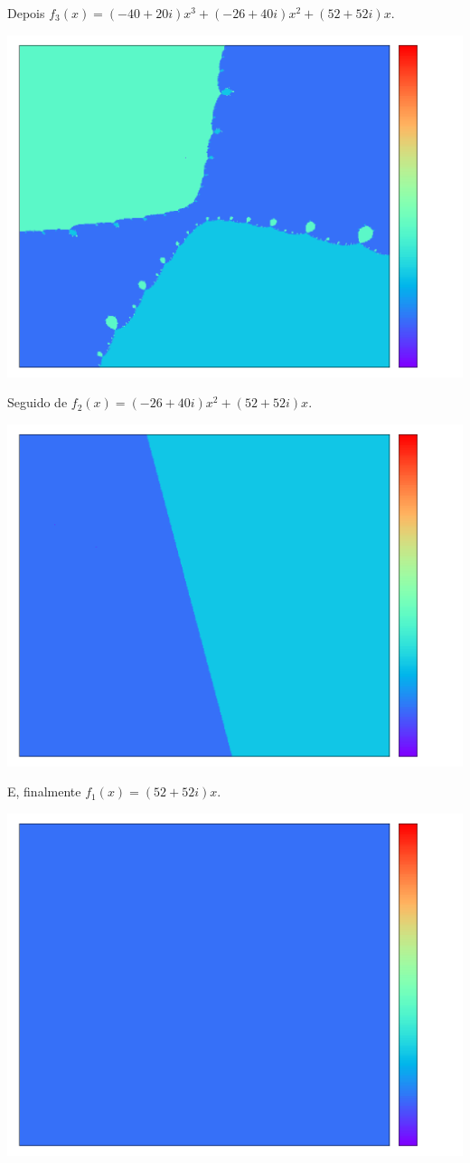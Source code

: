 \documentclass{article}
\begin{document}
Depois $f_3(x) = (-40+20i)x^3 + (-26+40i)x^2 + (52+52i)x$.  
\begin{center}\includegraphics[width=0.75\columnwidth]{expand_3} \end{center}
Seguido de $f_2(x) = (-26+40i)x^2 + (52+52i)x$.  
\begin{center}\includegraphics[width=0.75\columnwidth]{expand_2} \end{center}
E, finalmente $f_1(x) = (52+52i)x$.  
\begin{center}\includegraphics[width=0.75\columnwidth]{expand_1} \end{center}
\end{document}
